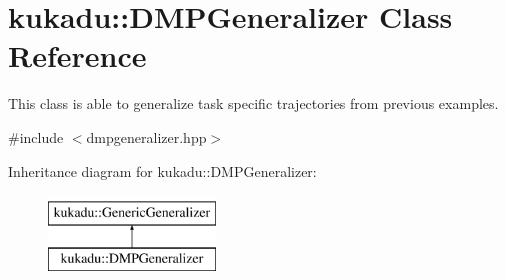 \hypertarget{classkukadu_1_1DMPGeneralizer}{\section{kukadu\-:\-:D\-M\-P\-Generalizer Class Reference}
\label{classkukadu_1_1DMPGeneralizer}
}


This class is able to generalize task specific trajectories from previous examples.  




{\ttfamily \#include $<$dmpgeneralizer.\-hpp$>$}

Inheritance diagram for kukadu\-:\-:D\-M\-P\-Generalizer\-:\begin{figure}[H]
\begin{center}
\leavevmode
\includegraphics[height=2.000000cm]{classkukadu_1_1DMPGeneralizer}
\end{center}
\end{figure}

